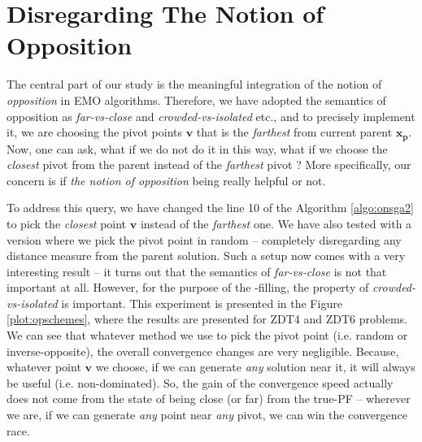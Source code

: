 \documentclass[journal]{IEEEtran}
\begin{document}
\section{Disregarding The Notion of Opposition}
\label{sec:inv-opp}
The central part of our study is the meaningful integration of the notion of \textit{opposition} in EMO algorithms. Therefore, we have adopted the semantics of opposition as \textit{far-vs-close} and \textit{crowded-vs-isolated} etc., and to precisely implement it, we are choosing the pivot points \(\mathbf{v}\) that is the \textit{farthest} from current parent \(\mathbf{x_p}\). Now, one can ask, what if we do not do it in this way, what if we choose the \textit{closest} pivot from the parent instead of the \textit{farthest} pivot ? More specifically, our concern is if \textit{the notion of opposition} being really helpful or not.

To address this query, we have changed the line 10 of the Algorithm \ref{algo:onsga2} to pick the \textit{closest} point \(\mathbf{v}\) instead of the \textit{farthest} one. We have also tested with a version where we pick the pivot point in random -- completely disregarding any distance measure from the parent solution. Such a setup now comes with a very interesting result -- it turns out that the semantics of \textit{far-vs-close} is not that important at all. However, for the purpose of the -filling, the property of \textit{crowded-vs-isolated} is important. This experiment is presented in the Figure \ref{plot:opschemes}, where the results are presented for ZDT4 and ZDT6 problems. We can see that whatever method we use to pick the pivot point (i.e. random or inverse-opposite), the overall convergence changes are very negligible. Because, whatever point \(\mathbf{v}\) we choose, if we can generate \textit{any} solution near it, it will always be useful (i.e. non-dominated). So, the gain of the convergence speed actually does not come from the state of being close (or far) from the true-PF -- wherever we are, if we can generate \textit{any} point near \textit{any} pivot, we can win the convergence race.
\end{document}
